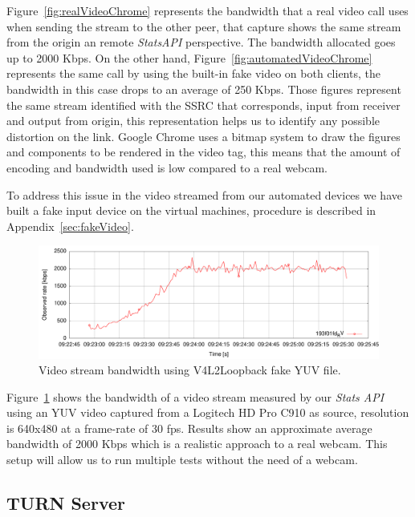 Figure~\ref{fig:realVideoChrome} represents the bandwidth that a real video call uses when sending the stream to the other peer, that capture shows the same stream from the origin an remote {\it StatsAPI} perspective. The bandwidth allocated goes up to 2000 Kbps. On the other hand, Figure~\ref{fig:automatedVideoChrome} represents the same call by using the built-in fake video on both clients, the bandwidth in this case drops to an average of 250 Kbps. Those figures represent the same stream identified with the SSRC that corresponds, input from receiver and output from origin, this representation helps us to identify any possible distortion on the link. Google Chrome uses a bitmap system to draw the figures and components to be rendered in the video tag, this means that the amount of encoding and bandwidth used is low compared to a real webcam.

To address this issue in the video streamed from our automated devices we have built a fake input device on the virtual machines, procedure is described in Appendix~\ref{sec:fakeVideo}.

 \begin{figure}[h]
  \centering
    \includegraphics[width=1\textwidth]{./figures/testV4L2niklas.pdf}
      \caption[Video stream bandwidth using V4L2Loopback fake YUV file]{Video stream bandwidth using V4L2Loopback fake YUV file.}
	\label{fig:testV4L2niklas}
\end{figure}

Figure~\ref{fig:testV4L2niklas} shows the bandwidth of a video stream measured by our {\it Stats API} using an YUV video captured from a Logitech HD Pro C910 as source, resolution is 640x480 at a frame-rate of 30 fps. Results show an approximate average bandwidth of 2000 Kbps which is a realistic approach to a real webcam. This setup will allow us to run multiple tests without the need of a webcam.

\subsection{TURN Server}

